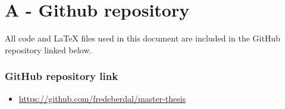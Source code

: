 \chapter*{A - Github repository}

All code and LaTeX files used in this document are included in the GitHub repository linked below.


\subsection*{GitHub repository link}
\begin{itemize}
    \item \url{https://github.com/fredeberdal/master-thesis}
\end{itemize}
